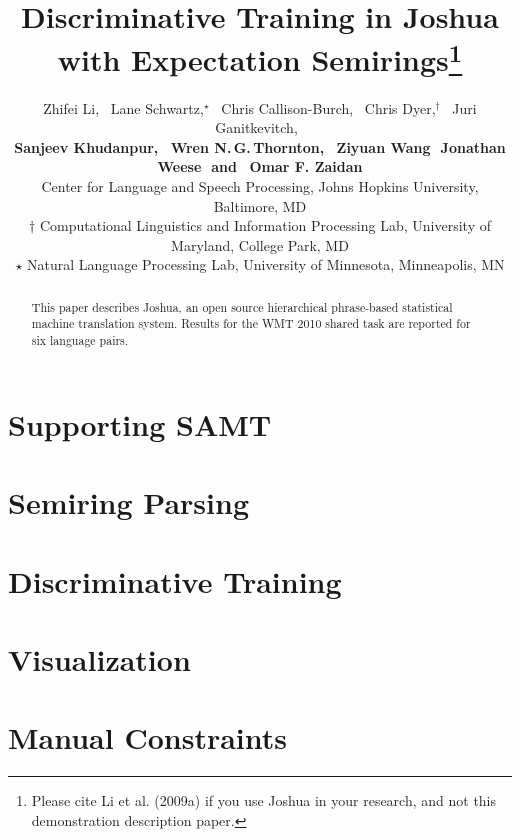 \documentclass[11pt]{article}
\title{Discriminative Training in Joshua with Expectation Semirings\footnote{ 
Please cite Li et al. (2009a) if you use Joshua in your research, and not this demonstration description paper. }}
\author{
Zhifei Li,\,\,\,
 Lane Schwartz,$^\star$\,\,\,
Chris Callison-Burch,\,\,\,
Chris Dyer,$^\dagger$\,\,\,
Juri Ganitkevitch,\,\,\, \\
{\bf Sanjeev Khudanpur,\,\,\, 
Wren N.\,G.\,Thornton,\,\,\,
Ziyuan Wang\,\,
Jonathan Weese\,\,
{\textnormal{and}}
\,\,\,Omar F. Zaidan}\\
Center for Language and Speech Processing, Johns Hopkins University, Baltimore, MD\\
$\dagger$ Computational Linguistics and Information Processing Lab, University of Maryland, College Park, MD\\
$\star$ Natural Language Processing Lab, University of Minnesota, Minneapolis, MN }
\date{}
\begin{document}
\maketitle

\begin{abstract}
 This paper describes Joshua, an open source hierarchical phrase-based statistical machine translation system. Results for the WMT 2010 shared task are reported for six language pairs.
\end{abstract}

\listoftodos

\section{Supporting SAMT}

\section{Semiring Parsing}

\section{Discriminative Training}

\section{Visualization}

\section{Manual Constraints}
\end{document}
